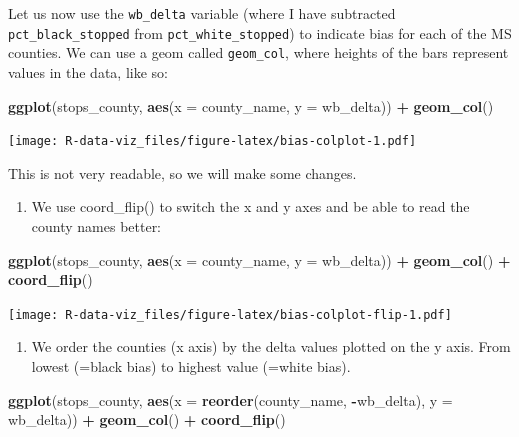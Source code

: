 \documentclass[]{book}
\newenvironment{Shaded}{\begin{snugshade}}{\end{snugshade}}
\newcommand{\KeywordTok}[1]{\textcolor[rgb]{0.13,0.29,0.53}{\textbf{#1}}}
\newcommand{\DataTypeTok}[1]{\textcolor[rgb]{0.13,0.29,0.53}{#1}}
\newcommand{\StringTok}[1]{\textcolor[rgb]{0.31,0.60,0.02}{#1}}
\newcommand{\OperatorTok}[1]{\textcolor[rgb]{0.81,0.36,0.00}{\textbf{#1}}}
\newcommand{\NormalTok}[1]{#1}
\providecommand{\tightlist}{%
  \setlength{\itemsep}{0pt}\setlength{\parskip}{0pt}}
\theoremstyle{definition}
\theoremstyle{definition}
\theoremstyle{definition}
\theoremstyle{remark}
\begin{document}
Let us now use the \texttt{wb\_delta} variable (where I have subtracted
\texttt{pct\_black\_stopped} from \texttt{pct\_white\_stopped}) to
indicate bias for each of the MS counties. We can use a geom called
\texttt{geom\_col}, where heights of the bars represent values in the
data, like so:

\begin{Shaded}
\begin{Highlighting}[]
\KeywordTok{ggplot}\NormalTok{(stops_county, }\KeywordTok{aes}\NormalTok{(}\DataTypeTok{x =}\NormalTok{ county_name, }\DataTypeTok{y =}\NormalTok{ wb_delta)) }\OperatorTok{+}\StringTok{ }
\StringTok{  }\KeywordTok{geom_col}\NormalTok{()}
\end{Highlighting}
\end{Shaded}

\texttt{[image: R-data-viz\_files/figure-latex/bias-colplot-1.pdf]}

This is not very readable, so we will make some changes.

\begin{enumerate}
\def\labelenumi{\arabic{enumi}.}
\tightlist
\item
  We use coord\_flip() to switch the x and y axes and be able to read
  the county names better:
\end{enumerate}

\begin{Shaded}
\begin{Highlighting}[]
\KeywordTok{ggplot}\NormalTok{(stops_county, }\KeywordTok{aes}\NormalTok{(}\DataTypeTok{x =}\NormalTok{ county_name, }\DataTypeTok{y =}\NormalTok{ wb_delta)) }\OperatorTok{+}
\StringTok{  }\KeywordTok{geom_col}\NormalTok{() }\OperatorTok{+}\StringTok{ }
\StringTok{  }\KeywordTok{coord_flip}\NormalTok{()}
\end{Highlighting}
\end{Shaded}

\texttt{[image: R-data-viz\_files/figure-latex/bias-colplot-flip-1.pdf]}

\begin{enumerate}
\def\labelenumi{\arabic{enumi}.}
\setcounter{enumi}{1}
\tightlist
\item
  We order the counties (x axis) by the delta values plotted on the y
  axis. From lowest (=black bias) to highest value (=white bias).
\end{enumerate}

\begin{Shaded}
\begin{Highlighting}[]
\KeywordTok{ggplot}\NormalTok{(stops_county, }\KeywordTok{aes}\NormalTok{(}\DataTypeTok{x =} \KeywordTok{reorder}\NormalTok{(county_name, }\OperatorTok{-}\NormalTok{wb_delta), }\DataTypeTok{y =}\NormalTok{ wb_delta)) }\OperatorTok{+}
\StringTok{  }\KeywordTok{geom_col}\NormalTok{() }\OperatorTok{+}\StringTok{ }
\StringTok{  }\KeywordTok{coord_flip}\NormalTok{()}
\end{Highlighting}
\end{Shaded}
\end{document}
